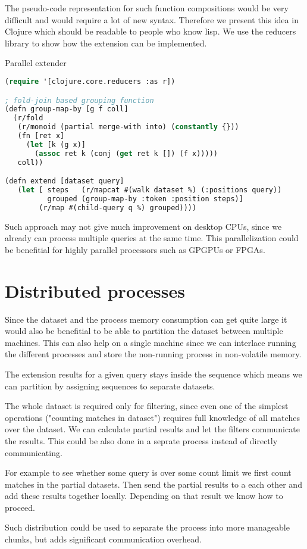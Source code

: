 The pseudo-code representation for such function compositions would be very difficult and would require a lot of new syntax. Therefore we present this idea in Clojure\cite{clojure} which should be readable to people who know lisp. We use the reducers library to show how the extension can be implemented.

\begin{algorithm}[H]
	\caption{Parallel extender}
\begin{lstlisting}[language=Lisp]
(require '[clojure.core.reducers :as r])

; fold-join based grouping function
(defn group-map-by [g f coll]
  (r/fold 
   (r/monoid (partial merge-with into) (constantly {}))
   (fn [ret x]
     (let [k (g x)]
       (assoc ret k (conj (get ret k []) (f x)))))
   coll))

(defn extend [dataset query]
   (let [ steps   (r/mapcat #(walk dataset %) (:positions query))
          grouped (group-map-by :token :position steps)]
        (r/map #(child-query q %) grouped))))
\end{lstlisting}
\end{algorithm}

Such approach may not give much improvement on desktop CPUs, since we already can process multiple queries at the same time. This parallelization could be benefitial for highly parallel processors such as GPGPUs or FPGAs.

\section{Distributed processes}

Since the dataset and the process memory consumption can get quite large it would also be benefitial to be able to partition the dataset between multiple machines. This can also help on a single machine since we can interlace running the different processes and store the non-running process in non-volatile memory.

The extension results for a given query stays inside the sequence which means we can partition by assigning sequences to separate datasets.

The whole dataset is required only for filtering, since even one of the simplest operations ("counting matches in dataset") requires full knowledge of all matches over the dataset. We can calculate partial results and let the filters communicate the results. This could be also done in a seprate process instead of directly communicating.

\begin{figure}[H]
	\scalebox{0.8}{}
\end{figure}

\begin{exmp}
For example to see whether some query is over some count limit we first count matches in the partial datasets. Then send the partial results to a each other and add these results together locally. Depending on that result we know how to proceed.
\end{exmp}

Such distribution could be used to separate the process into more manageable chunks, but adds significant communication overhead.